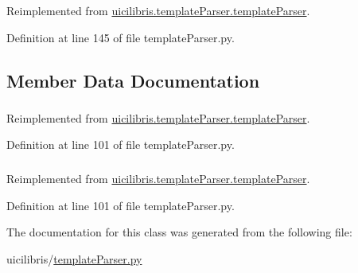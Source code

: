 \-Reimplemented from \hyperlink{classuicilibris_1_1templateParser_1_1templateParser_a48f677f123127c39f6c84eb3737e2ded}{uicilibris.\-template\-Parser.\-template\-Parser}.



\-Definition at line 145 of file template\-Parser.\-py.



\subsection{\-Member \-Data \-Documentation}
\hypertarget{classuicilibris_1_1templateParser_1_1imageParser_acbade4bd60a213ae591dad90f64021a7}{
\subsubsection[{pattern}]{}}\label{classuicilibris_1_1templateParser_1_1imageParser_acbade4bd60a213ae591dad90f64021a7}


\-Reimplemented from \hyperlink{classuicilibris_1_1templateParser_1_1templateParser_a11df7ff35853b6cc9015f5c5451aa921}{uicilibris.\-template\-Parser.\-template\-Parser}.



\-Definition at line 101 of file template\-Parser.\-py.

\hypertarget{classuicilibris_1_1templateParser_1_1imageParser_aaf8ed396434c4dc4b6edc3dcf1ffbbd2}{
\subsubsection[{regexp}]{}}\label{classuicilibris_1_1templateParser_1_1imageParser_aaf8ed396434c4dc4b6edc3dcf1ffbbd2}


\-Reimplemented from \hyperlink{classuicilibris_1_1templateParser_1_1templateParser_ac3d4f484ad1e51f0191b43c21f4a6873}{uicilibris.\-template\-Parser.\-template\-Parser}.



\-Definition at line 101 of file template\-Parser.\-py.



\-The documentation for this class was generated from the following file\-:\begin{DoxyCompactItemize}
\item 
uicilibris/\hyperlink{templateParser_8py}{template\-Parser.\-py}\end{DoxyCompactItemize}

